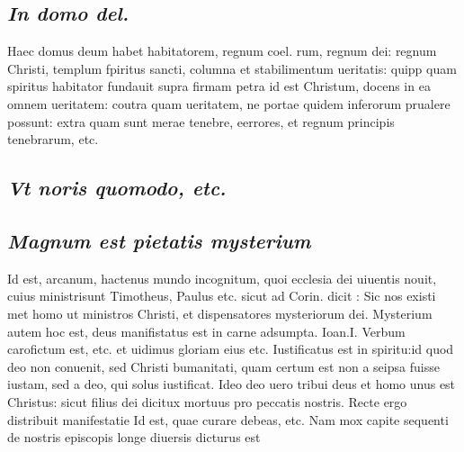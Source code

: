 \documentclass{article}
\begin{document}
\begin{pages}
\subsection*{\textit{In domo del. }}\pstart Haec domus deum habet habitatorem, regnum coel. rum, regnum dei: regnum Christi, templum fpiritus sancti, columna et stabilimentum ueritatis: quipp quam spiritus habitator fundauit supra firmam petra id est Christum, docens in ea omnem ueritatem: coutra quam ueritatem, ne portae quidem inferorum prualere possunt: extra quam sunt merae tenebre, eerrores, et regnum principis tenebrarum, etc.  \pend
{}
{}
\subsection*{\textit{Vt noris quomodo, etc. }}
{}
\subsection*{\textit{Magnum est pietatis mysterium }}\pstart Id est, arcanum, hactenus mundo incognitum, quoi ecclesia dei uiuentis nouit, cuius ministrisunt Timotheus, Paulus etc. sicut ad Corin. dicit : Sic nos existi met homo ut ministros Christi, et dispensatores mysteriorum dei. Mysterium autem hoc est, deus manifistatus est in carne adsumpta. Ioan.I. Verbum carofictum est, etc. et uidimus gloriam eius etc. Iustificatus est in spiritu:id quod deo non conuenit, sed Christi bumanitati, quam certum est non a seipsa fuisse iustam, sed a deo, qui solus iustificat. Ideo deo uero tribui deus et homo unus est Christus: sicut filius dei dicitux mortuus pro peccatis nostris. Recte ergo distribuit manifestatie  \pend\pstart Id est, quae curare debeas, etc. Nam mox capite sequenti de nostris episcopis longe diuersis dicturus est  \pend

\end{pages}
\end{document}
